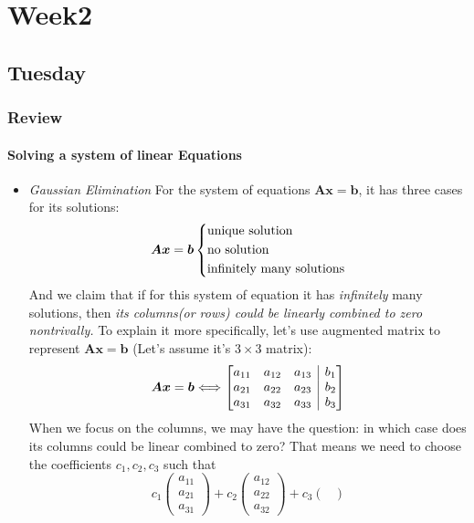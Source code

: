 
\chapter{Week2}

\section{Tuesday}
\subsection{Review}
\subsubsection{Solving a system of linear Equations}
\begin{itemize}
\item
\emph{Gaussian Elimination}
For the system of equations $\bm A\bm x = \bm b$, it has three cases for its solutions:
\[
\bm A\bm x = \bm b\left\{
\begin{lgathered}
\text{unique solution}\\
\text{no solution}\\
\text{infinitely many solutions}
\end{lgathered}
\right.
\]
And we claim that if for this system of equation it has \emph{infinitely} many solutions, then \textit{its columns(or rows) could be linearly combined to zero nontrivally.} To explain it more specifically, let's use augmented matrix to represent $\bm A\bm x = \bm b$ (Let's assume it's $3\times 3$ matrix):
\[
\bm A\bm x = \bm b\Longleftrightarrow 
\left[
\begin{array}{@{}ccc|c@{}}
a_{11}&a_{12}&a_{13}&b_1\\
a_{21}&a_{22}&a_{23}&b_2\\
a_{31}&a_{32}&a_{33}&b_3
\end{array}
\right]
\]
When we focus on the columns, we may have the question: in which case does its columns could be linear combined to zero? That means we need to choose the coefficients $c_1,c_2,c_3$ such that 
\[
c_1\begin{pmatrix}
a_{11}\\a_{21}\\a_{31}
\end{pmatrix}+c_2\begin{pmatrix}
a_{12}\\a_{22}\\a_{32}
\end{pmatrix}+c_3\begin{pmatrix}

\end{pmatrix}\]
\end{itemize}
